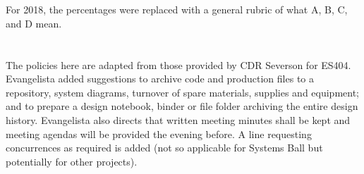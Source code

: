 \documentclass[10pt,courier]{navymemo}
\begin{document}
\section{} For 2018, the percentages were replaced with a general rubric of what A, B, C, and D mean. 

\section{}  The policies here are adapted from those provided by CDR Severson for ES404.  Evangelista added suggestions to archive code and production files to a repository, system diagrams, turnover of spare materials, supplies and equipment; and to prepare a design notebook, binder or file folder archiving the entire design history.  Evangelista also directs that written meeting minutes shall be kept and meeting agendas will be provided the evening before. A line requesting concurrences as required is added (not so applicable for Systems Ball but potentially for other projects). 

\end{document}
